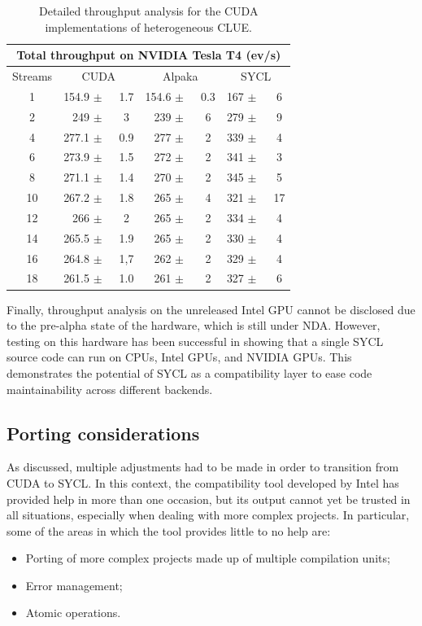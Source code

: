 \begin{table}[H]
    \centering
    \begin{tabular}{|c|r@{}c|r@{}c|r@{}c|}
 \hline
 \multicolumn{7}{|c|}{Total throughput on NVIDIA Tesla T4 (ev/s)} \\
 \hline
 Streams & \multicolumn{2}{c|}{CUDA} & \multicolumn{2}{c|}{Alpaka} & \multicolumn{2}{c|}{SYCL}\\
 \hline
 1 & 154.9 $\pm$&  ~1.7 & 154.6 $\pm$&  ~0.3 & 167 $\pm$&  ~6 \\
 2 & 249 $\pm$&  ~3 & 239 $\pm$&  ~6 & 279 $\pm$&  ~9 \\
 4 & 277.1 $\pm$&  ~0.9 & 277 $\pm$&  ~2 &	339 $\pm$&  ~4 \\
 6 & 273.9 $\pm$&  ~1.5 & 272 $\pm$&  ~2 & 341 $\pm$&  ~3 \\
 8 & 271.1 $\pm$&  ~1.4 & 270 $\pm$&  ~2 & 345 $\pm$&  ~5 \\
 10 & 267.2 $\pm$&  ~1.8 & 265 $\pm$&  ~4 &	321 $\pm$&  ~17 \\
 12 & 266 $\pm$&  ~2 & 265 $\pm$&  ~2 & 334 $\pm$&  ~4 \\
 14 & 265.5 $\pm$&  ~1.9 & 265 $\pm$&  ~2 & 330 $\pm$&  ~4 \\
 16 & 264.8 $\pm$&  ~1,7 & 262 $\pm$&  ~2 &	329 $\pm$&  ~4 \\
 18 & 261.5 $\pm$&  ~1.0 & 261 $\pm$&  ~2 &	327 $\pm$&  ~6 \\
 \hline
\end{tabular}
    \caption{Detailed throughput analysis for the CUDA implementations of heterogeneous CLUE.}
    \label{tab:hclue_cuda_performance}
\end{table}

Finally, throughput analysis on the unreleased Intel GPU cannot be disclosed due to the pre-alpha state of the hardware, which is still under NDA. However, testing on this hardware has been successful in showing that a single SYCL source code can run on CPUs, Intel GPUs, and NVIDIA GPUs. This demonstrates the potential of SYCL as a compatibility layer to ease code maintainability across different backends.

\subsection{Porting considerations}
As discussed, multiple adjustments had to be made in order to transition from CUDA to SYCL. In this context, the compatibility tool developed by Intel has provided help in more than one occasion, but its output cannot yet be trusted in all situations, especially when dealing with more complex projects. In particular, some of the areas in which the tool provides little to no help are:
\begin{itemize}
    \item Porting of more complex projects made up of multiple compilation units;
    \item Error management;
    \item Atomic operations.
\end{itemize}

